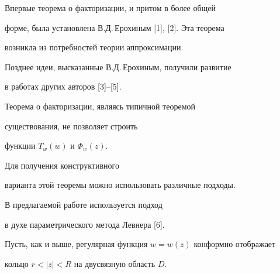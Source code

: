 Впервые теорема о факторизации, и притом в более общей


форме, была установлена В.Д.\,Еро\-хи\-ным [1], [2]. Эта теорема


возникла из потребностей теории аппроксимации.


Позднее идеи, высказанные В.Д.\,Ерохиным, получили развитие


в работах других авторов [3]--[5]. 





Теорема о факторизации, являясь типичной теоремой 


существования, не позволяет строить 


функции $T_{w}(w)$ и $\Phi_{w}(z)$.


Для получения конструктивного


варианта этой теоремы можно использовать различные подходы.


В предлагаемой работе используется подход 


в духе параметрического метода Левнера [6].





Пусть, как и выше, регулярная функция $w=w(z)$ конформно отображает


кольцо $r<|z|<R$ на двусвязную область $D$.





